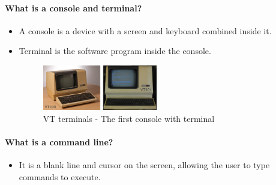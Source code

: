 \setlength{\columnsep}{5pt}
\begin{flushleft}
	\bigskip
	\bigskip
	\paragraph{What is a console and terminal?}
	\begin{itemize}
		\item A console is a device with a screen and keyboard combined inside it.
		\item Terminal is the software program inside the console.
			\begin{figure}[h!]
			\centering
			\includegraphics[width=5cm]{content/chapter1/images/console.png}
			\caption{VT terminals - The first console with terminal}%
			\label{fig:example}%
			\end{figure}		
	\end{itemize}

	\paragraph{What is a command line?}
	\begin{itemize}
		\item It is a blank line and cursor on the screen, allowing the user to type commands to execute.
	

\end{itemize}
\end{flushleft}
